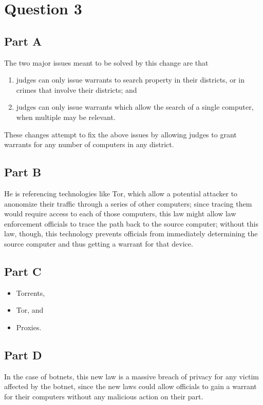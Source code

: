 \documentclass[12pt]{article}
\begin{document}
\section*{Question 3}
\subsection*{Part A}
The two major issues meant to be solved by this change are that
\begin{enumerate}
\item judges can only issue warrants to search property in their districts, or in crimes that involve their districts; and
\item judges can only issue warrants which allow the search of a single computer, when multiple may be relevant.
\end{enumerate}

These changes attempt to fix the above issues by allowing judges to grant warrants for any number of computers in any district.

\subsection*{Part B}
He is referencing technologies like Tor, which allow a potential attacker to anonomize their traffic through a series of other computers; since tracing them would require access to each of those computers, this law might allow law enforcement officials to trace the path back to the source computer; without this law, though, this technology prevents officials from immediately determining the source computer and thus getting a warrant for that device.

\subsection*{Part C}
\begin{itemize}
\item Torrents,
\item Tor, and
\item Proxies.
\end{itemize}

\subsection*{Part D}
In the case of botnets, this new law is a massive breach of privacy for any victim affected by the botnet, since the new laws could allow officials to gain a warrant for their computers without any malicious action on their part.
\end{document}

